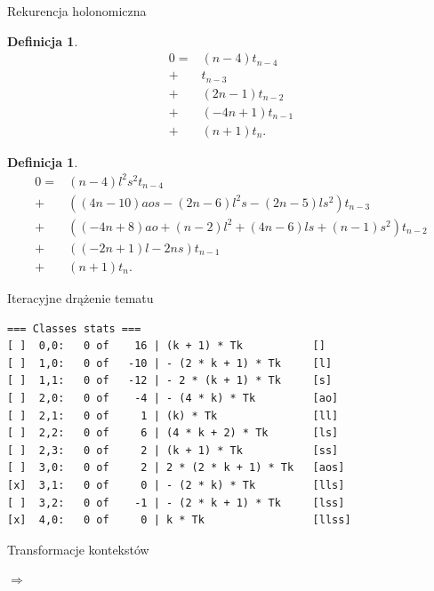 \documentclass[final]{beamer}
\theoremstyle{bluetheorem}
\theoremstyle{bluetheorem}
\newtheorem{mydefinition}[mytheorem]{Definicja}
\theoremstyle{greentheorem}
\newcommand{\includeinlinescaledsvg}[3]{\begin{minipage}{#1\textwidth}\begin{center}\end{center}\end{minipage}}
\begin{document}
\begin{frame}{Rekurencja holonomiczna}
    \begin{mydefinition}
        \[\begin{array}{rl}
                0 =& (n - 4) t_{n - 4}\\
                +& t_{n - 3}\\
                +& (2 n - 1) t_{n - 2}\\
                +& (-4 n + 1) t_{n - 1}\\
                +& (n + 1) t_{n}.
        \end{array}\]
    \end{mydefinition}

    \begin{mydefinition}
        \[\begin{array}{rl}
            0 =& (n - 4) l^2 s^2 t_{n - 4}\\
            +& ((4 n - 10) a o s - (2 n - 6) l^2 s - (2 n - 5) l s^2) t_{n - 3}\\
            +& ((-4 n + 8) a o + (n - 2) l^2 + (4 n - 6) l s + (n - 1) s^2) t_{n - 2}\\
            +& ((-2 n + 1) l - 2 n s) t_{n - 1}\\
            +& (n + 1) t_{n}.
        \end{array}\]
    \end{mydefinition}
\end{frame}

\begin{frame}[fragile]{Iteracyjne drążenie tematu}
    \begin{block}{}
\begin{lstlisting}
=== Classes stats ===
[ ]  0,0:   0 of    16 | (k + 1) * Tk           []
[ ]  1,0:   0 of   -10 | - (2 * k + 1) * Tk     [l]
[ ]  1,1:   0 of   -12 | - 2 * (k + 1) * Tk     [s]
[ ]  2,0:   0 of    -4 | - (4 * k) * Tk         [ao]
[ ]  2,1:   0 of     1 | (k) * Tk               [ll]
[ ]  2,2:   0 of     6 | (4 * k + 2) * Tk       [ls]
[ ]  2,3:   0 of     2 | (k + 1) * Tk           [ss]
[ ]  3,0:   0 of     2 | 2 * (2 * k + 1) * Tk   [aos]
[x]  3,1:   0 of     0 | - (2 * k) * Tk         [lls]
[ ]  3,2:   0 of    -1 | - (2 * k + 1) * Tk     [lss]
[x]  4,0:   0 of     0 | k * Tk                 [llss]
\end{lstlisting}
    \end{block}
\end{frame}

\begin{frame}{Transformacje kontekstów}
    \begin{block}{}
        \begin{center}
            \includeinlinescaledsvg{.4}{.5}{lambda__contexts__def_001}%
            \(\Rightarrow\)
            \includeinlinescaledsvg{.4}{.5}{lambda__contexts__def_002}%
        \end{center}
    \end{block}
\end{frame}
\end{document}
